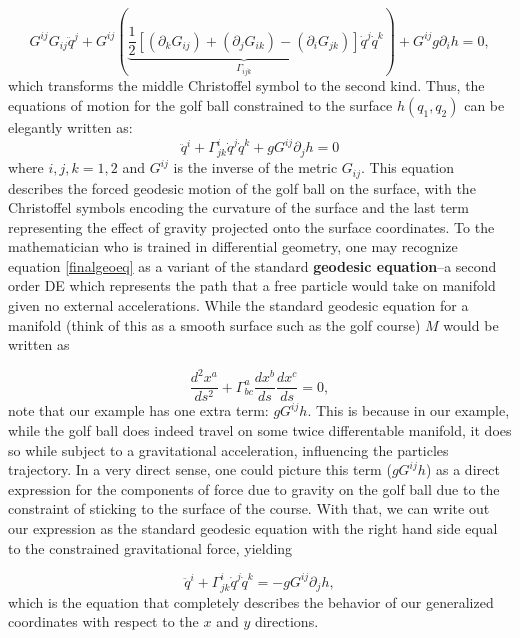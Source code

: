 $$G^{ij}G_{ij}\ddot q^j + G^{ij}\left(\underbrace{\frac{1}{2}\left[(\partial_k G_{ij}) + (\partial_jG_{ik})-(\partial_iG_{jk})\right]}_{\Gamma_{ijk}}\dot q^j \dot q^k\right) +G^{ij}g \partial_i h = 0,$$
which transforms the middle Christoffel symbol to the second kind. Thus, the equations of motion for the golf ball constrained to the surface $h(q_1, q_2)$ can be elegantly written as:
\begin{equation}
	\ddot{q}^i + \Gamma^i_{jk} \dot{q}^j \dot{q}^k + g G^{ij} \partial_j h = 0
	\label{finalgeoeq}
\end{equation}
where $i, j, k = 1, 2$ and $G^{ij}$ is the inverse of the metric $G_{ij}$. This equation describes the forced geodesic motion of the golf ball on the surface, with the Christoffel symbols encoding the curvature of the surface and the last term representing the effect of gravity projected onto the surface coordinates. To the mathematician who is trained in differential geometry, one may recognize equation \ref{finalgeoeq} as a variant of the standard \textbf{geodesic equation}--a second order DE which represents the path that a free particle would take on manifold given no external accelerations. While the standard geodesic equation for a manifold (think of this as a smooth surface such as the golf course) $M$ would be written as

\begin{equation}
\frac{d^2x^a}{ds^2}+\Gamma^a_{bc}\frac{dx^b}{ds}\frac{dx^c}{ds}=0,
\end{equation}
note that our example has one extra term: $gG^{ij}h$. This is because in our example, while the golf ball does indeed travel on some twice differentable manifold, it does so while subject to a gravitational acceleration, influencing the particles trajectory. In a very direct sense, one could picture this term ($gG^{ij}h$) as a direct expression for the components of force due to gravity on the golf ball due to the constraint of sticking to the surface of the course. With that, we can write out our expression as the standard geodesic equation with the right hand side equal to the constrained gravitational force, yielding

\begin{equation}
	\boxed{\ddot{q}^i + \Gamma^i_{jk} \dot{q}^j \dot{q}^k =  -g G^{ij} \partial_j h },
	\label{finalgeoeqrearranged}
\end{equation}
which is the equation that completely describes the behavior of our generalized coordinates with respect to the $x$ and $y$ directions.

